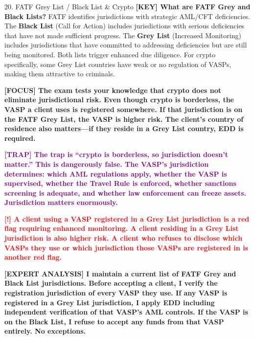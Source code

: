 \documentclass[11pt,a4paper]{beamer}
\newcommand{\redflag}[1]{\textcolor{red}{\textbf{[!] #1}}}
\newcommand{\examfocus}[1]{\textcolor{orange!80!black}{\textbf{[FOCUS] #1}}}
\newcommand{\trap}[1]{\textcolor{purple}{\textbf{[TRAP] #1}}}
\newcommand{\keyterm}[1]{\textcolor{red!80!black}{\textbf{[KEY] #1}}}
\newcommand{\expert}[1]{\textcolor{blue!70!black}{\textbf{[EXPERT ANALYSIS] #1}}}
\begin{document}
	\begin{frame}{20. FATF Grey List / Black List \& Crypto}
		\tiny
		\keyterm{What are FATF Grey and Black Lists?} FATF identifies jurisdictions with strategic AML/CFT deficiencies. The \textbf{Black List} (Call for Action) includes jurisdictions with serious deficiencies that have not made sufficient progress. The \textbf{Grey List} (Increased Monitoring) includes jurisdictions that have committed to addressing deficiencies but are still being monitored. Both lists trigger enhanced due diligence. For crypto specifically, some Grey List countries have weak or no regulation of VASPs, making them attractive to criminals.
		
		\vspace{0.1cm}
		\examfocus{The exam tests your knowledge that crypto does not eliminate jurisdictional risk. Even though crypto is borderless, the VASP a client uses is registered somewhere. If that jurisdiction is on the FATF Grey List, the VASP is higher risk. The client's country of residence also matters—if they reside in a Grey List country, EDD is required.}
		
		\vspace{0.1cm}
		\trap{The trap is “crypto is borderless, so jurisdiction doesn't matter.” This is dangerously false. The VASP's jurisdiction determines: which AML regulations apply, whether the VASP is supervised, whether the Travel Rule is enforced, whether sanctions screening is adequate, and whether law enforcement can freeze assets. Jurisdiction matters enormously.}
		
		\vspace{0.1cm}
		\redflag{A client using a VASP registered in a Grey List jurisdiction is a red flag requiring enhanced monitoring. A client residing in a Grey List jurisdiction is also higher risk. A client who refuses to disclose which VASPs they use or which jurisdiction those VASPs are registered in is another red flag.}
		
		\vspace{0.1cm}
		\expert{I maintain a current list of FATF Grey and Black List jurisdictions. Before accepting a client, I verify the registration jurisdiction of every VASP they use. If any VASP is registered in a Grey List jurisdiction, I apply EDD including independent verification of that VASP's AML controls. If the VASP is on the Black List, I refuse to accept any funds from that VASP entirely. No exceptions.}
	\end{frame}
	
\end{document}
